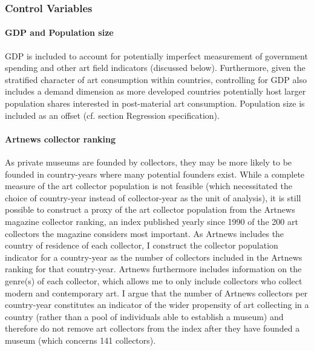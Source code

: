 \documentclass[11pt]{article}
\begin{document}
\subsubsection*{Control Variables}

\paragraph*{GDP and Population size}

GDP is included to account for potentially imperfect measurement of government spending and other art field indicators (discussed below). 
Furthermore, given the stratified character of art consumption \parencite{Bourdieu_1984_distinction} within countries, controlling for GDP also includes a demand dimension as more developed countries potentially host larger population shares interested in post-material art consumption.
Population size is included as an offset (cf. section Regression specification). 



\paragraph*{Artnews collector ranking}

As private museums are founded by collectors, they may be more likely to be founded in country-years where many potential founders exist.
While a complete measure of the art collector population is not feasible (which necessitated the choice of country-year instead of collector-year as the unit of analysis), it is still possible to construct a proxy of the art collector population from the Artnews magazine collector ranking, an index published yearly since 1990 of the 200 art collectors the magazine considers most important.
As Artnews includes the country of residence of each collector, I construct the collector population indicator for a country-year as the number of collectors included in the Artnews ranking for that country-year.
Artnews furthermore includes information on the genre(s) of each collector, which allows me to only include collectors who collect modern and contemporary art.
I argue that the number of Artnews collectors per country-year constitutes an indicator of the wider propensity of art collecting in a country (rather than a pool of individuals able to establish a museum) and therefore do not remove art collectors from the index after they have founded a museum (which concerns 141 collectors).
\end{document}

